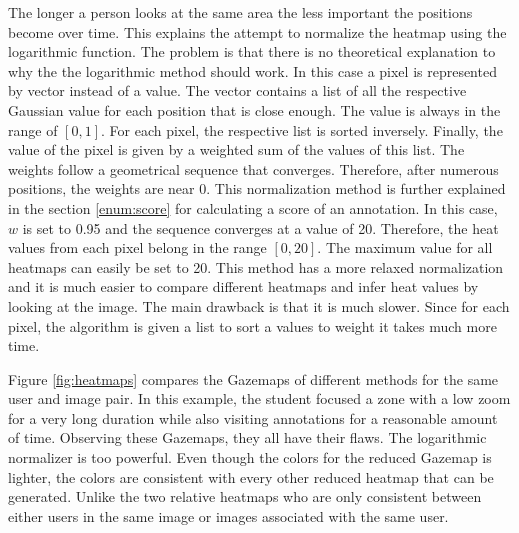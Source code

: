 \documentclass[a4paper,11pt]{report}
\numberwithin{figure}{section} %
\begin{document}
\begin{itemize}
\begin{itemize}
            The longer a person looks at the same area the less important the positions become over time.
            This explains the attempt to normalize the heatmap using the logarithmic function.
            The problem is that there is no theoretical explanation to why the the logarithmic method should work.
            In this case a pixel is represented by vector instead of a value.
            The vector contains a list of all the respective Gaussian value for each position that is close enough.
            The value is always in the range of $[0,1]$.
            For each pixel, the respective list is sorted inversely.
            Finally, the value of the pixel is given by a weighted sum of the values of this list.
            The weights follow a geometrical sequence that converges.
            Therefore, after numerous positions, the weights are near 0.
            This normalization method is further explained in the section \ref{enum:score} for calculating a score of an annotation.
            In this case, $w$ is set to 0.95 and the sequence converges at a value of 20.
            Therefore, the heat values from each pixel belong in the range $[0,20]$.
            The maximum value for all heatmaps can easily be set to 20.
            This method has a more relaxed normalization and it is much easier to compare different heatmaps and infer heat values by looking at the image.
            The main drawback is that it is much slower.
            Since for each pixel, the algorithm is given a list to sort a values to weight it takes much more time.
        \end{itemize}
        Figure \ref{fig:heatmaps} compares the Gazemaps of different methods for the same user and image pair.
        In this example, the student focused a zone with a low zoom for a very long duration while also visiting annotations for a reasonable amount of time.
        Observing these Gazemaps, they all have their flaws.
        The logarithmic normalizer is too powerful.
        Even though the colors for the reduced Gazemap is lighter, the colors are consistent with every other reduced heatmap that can be generated.
        Unlike the two relative heatmaps who are only consistent between either users in the same image or images associated with the same user.


\end{itemize}
\end{document}
